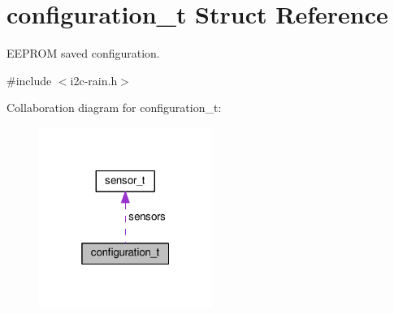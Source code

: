 \hypertarget{structconfiguration__t}{}\section{configuration\+\_\+t Struct Reference}
\label{structconfiguration__t}


E\+E\+P\+R\+OM saved configuration.  




{\ttfamily \#include $<$i2c-\/rain.\+h$>$}



Collaboration diagram for configuration\+\_\+t\+:\nopagebreak
\begin{figure}[H]
\begin{center}
\leavevmode
\includegraphics[width=160pt]{structconfiguration__t__coll__graph}
\end{center}
\end{figure}
